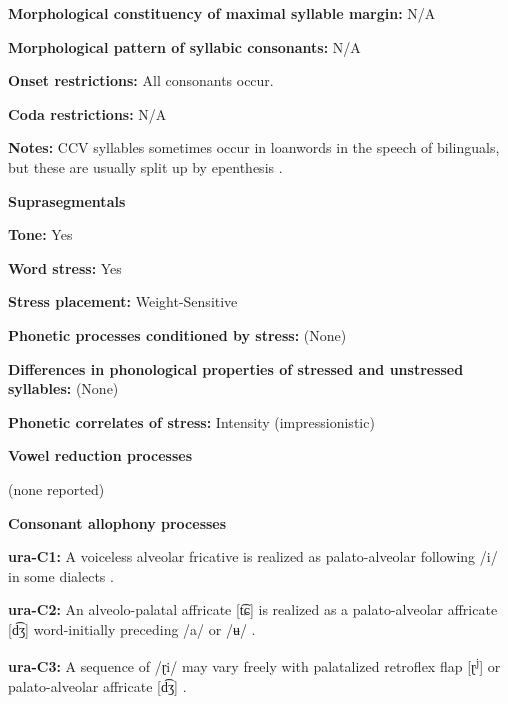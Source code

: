 \textbf{Morphological constituency of maximal syllable margin:} N/A



\textbf{Morphological pattern of syllabic consonants:} N/A



\textbf{Onset restrictions:} All consonants occur.



\textbf{Coda restrictions:} N/A



\textbf{Notes:} CCV syllables sometimes occur in  loanwords in the speech of bilinguals, but these are usually split up by epenthesis \citep[76]{Olawsky2006}.



\textbf{Suprasegmentals}



\textbf{Tone:} Yes



\textbf{Word stress:} Yes



\textbf{Stress placement:} Weight-Sensitive



\textbf{Phonetic processes conditioned by stress:} (None)



\textbf{Differences in phonological properties of stressed and unstressed syllables:} (None)



\textbf{Phonetic correlates of stress:} Intensity (impressionistic)



\textbf{Vowel reduction processes}



(none reported)



\textbf{Consonant allophony processes}



\textbf{ura-C1:} A voiceless alveolar fricative is realized as palato-alveolar following /i/ in some dialects \citep[38]{Olawsky2006}.



\textbf{ura-C2:} An alveolo-palatal affricate [t͡ɕ] is realized as a palato-alveolar affricate [d͡ʒ] word-initially preceding /a/ or /ʉ/ \citep[39]{Olawsky2006}.



\textbf{ura-C3:} A sequence of /ɽi/ may vary freely with palatalized retroflex flap [ɽ\textsuperscript{j}] or palato-alveolar affricate [d͡ʒ] \citep[71]{Olawsky2006}.



